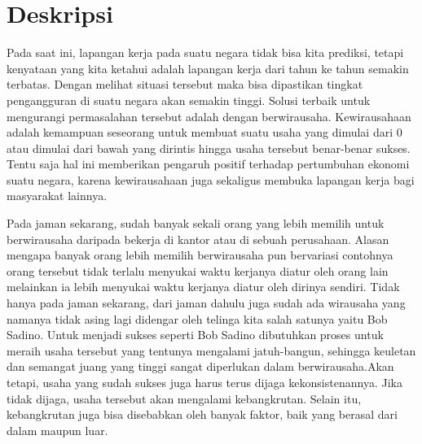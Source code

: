 \documentclass[a4paper,twoside]{article}
\begin{document}
\title{\@judultopik}
\author{\nama \textendash \@npm} 

\newcommand{\nama}{Vanessa Sukamto}
\newcommand{\@npm}{2014730010}
\newcommand{\@judultopik}{Simulator Pertumbuhan Wirausaha Berbasis Cellular Automata} %
\newcommand{\jumpemb}{1} %
\newcommand{\tanggal}{01/01/1900}


\maketitle


\section{Deskripsi}
Pada saat ini, lapangan kerja pada suatu negara tidak bisa kita prediksi, tetapi kenyataan yang kita ketahui adalah lapangan kerja dari tahun ke tahun semakin terbatas. Dengan melihat situasi tersebut maka bisa dipastikan tingkat pengangguran di suatu negara akan semakin tinggi. Solusi terbaik untuk mengurangi permasalahan tersebut adalah dengan berwirausaha. Kewirausahaan adalah kemampuan seseorang untuk membuat suatu usaha yang dimulai dari 0 atau dimulai dari bawah yang dirintis hingga usaha tersebut benar-benar sukses. Tentu saja hal ini memberikan pengaruh positif terhadap pertumbuhan ekonomi suatu negara, karena kewirausahaan juga sekaligus membuka lapangan kerja bagi masyarakat lainnya.

 
Pada jaman sekarang, sudah banyak sekali orang yang lebih memilih untuk berwirausaha daripada bekerja di kantor atau di sebuah perusahaan.  Alasan mengapa banyak orang lebih memilih berwirausaha pun bervariasi contohnya orang tersebut tidak terlalu menyukai waktu kerjanya diatur oleh orang lain melainkan ia lebih menyukai waktu kerjanya diatur oleh dirinya sendiri. Tidak hanya pada jaman sekarang, dari jaman dahulu juga sudah ada wirausaha yang namanya tidak asing lagi didengar oleh telinga kita salah satunya yaitu Bob Sadino. Untuk menjadi sukses seperti Bob Sadino dibutuhkan proses untuk meraih usaha tersebut yang tentunya mengalami jatuh-bangun, sehingga keuletan dan semangat juang yang tinggi sangat diperlukan dalam berwirausaha.Akan tetapi, usaha yang sudah sukses juga harus terus dijaga kekonsistenannya. Jika tidak dijaga, usaha tersebut akan mengalami kebangkrutan. Selain itu, kebangkrutan juga bisa disebabkan oleh banyak faktor, baik yang berasal dari dalam maupun luar.
\end{document}
